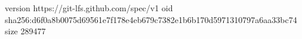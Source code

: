 version https://git-lfs.github.com/spec/v1
oid sha256:d6f0a8b0075d69561e7f178e4eb679c7382e1b6b170d5971310797a6aa33bc74
size 289477
